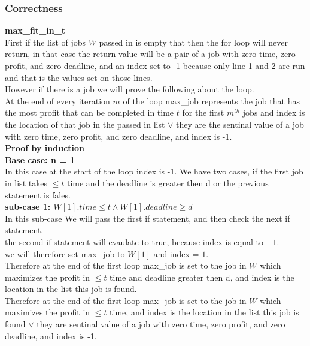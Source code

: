 \documentclass{article}
\begin{document}
      \subsubsection{Correctness}
        \textbf{max\_fit\_in\_t}\\
        First if the list of jobs $W$ passed in is empty that then the for loop will never return, in that case the return value will be a pair of a job with zero time, zero profit, and zero deadline, and an index set to -1 because only line 1 and 2 are run and that is the values set on those lines.\\
        However if there is a job we will prove the following about the loop.\\
        At the end of every iteration $m$ of the loop max\_job represents the job that has the most profit that can be completed in time $t$ for the first $m^{th}$ jobs and index is the location of that job in the passed in list $\lor$ they are the sentinal value of a job with zero time, zero profit, and zero deadline, and index is -1.\\
        \textbf{Proof by induction}\\
        \textbf{Base case: n = 1}\\
        In this case at the start of the loop index is -1. We have two cases, if the first job in list takes $\leq t$ time and the deadline is greater then d or the previous statement is fales.\\
        \textbf{sub-case 1: $W[1].time \leq t \land W[1].deadline \geq d$}\\
        \indent In this sub-case We will pass the first if statement, and then check the next if statement.\\
        \indent the second if statement will evaulate to true, because index is equal to $-1$.\\
        \indent we will therefore set max\_job to $W[1]$ and index = $1$.\\
        \indent Therefore at the end of the first loop max\_job is set to the job in $W$ which maximizes the profit in $\leq t$ time and deadline greater then d, and index is the location in the list this job is found.\\
        \indent Therefore at the end of the first loop max\_job is set to the job in $W$ which maximizes the profit in $\leq t$ time, and index is the location in the list this job is found $\lor$ they are sentinal value of a job with zero time, zero profit, and zero deadline, and index is -1.\\
\end{document}
